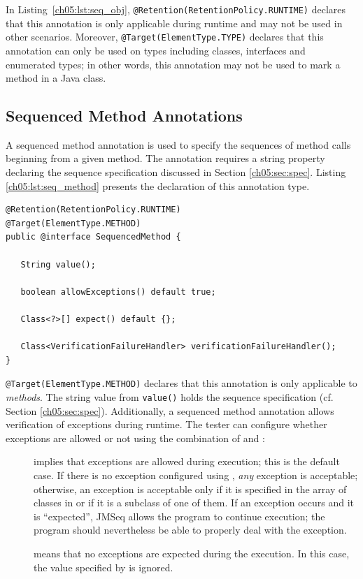 In Listing~\ref{ch05:lst:seq_obj}, {\small\texttt{@Retention(RetentionPolicy.RUNTIME)}} declares that this
annotation is only applicable during runtime and may  not be used in other scenarios.
Moreover, {\small\texttt{@Target(ElementType.TYPE)}} declares that this
annotation can only be used on types including classes, interfaces and
enumerated types; in other words, this annotation may not be used to mark a method
in a Java class.

\subsection{Sequenced Method Annotations}
A sequenced method annotation is used to specify the sequences of method
calls beginning from a given method. The annotation requires a string
property declaring the sequence specification discussed in Section
\ref{ch05:sec:spec}. Listing \ref{ch05:lst:seq_method} presents the declaration of
this annotation type.

\lstset{language=Java}
\begin{lstlisting}[label=ch05:lst:seq_method, caption=SequencedMethod Annotation Declaration]
@Retention(RetentionPolicy.RUNTIME)
@Target(ElementType.METHOD)
public @interface SequencedMethod {

   String value();

   boolean allowExceptions() default true;

   Class<?>[] expect() default {};

   Class<VerificationFailureHandler> verificationFailureHandler();
}
\end{lstlisting}

{\small\texttt{@Target(ElementType.METHOD)}} declares that this annotation is
only applicable to \textit{methods}. The string value from
{\small\texttt{value()}} holds the sequence specification (cf.
Section \ref{ch05:sec:spec}). 
Additionally, a sequenced method annotation allows verification of
exceptions during runtime. The tester can configure whether exceptions
are allowed or not using the combination of 
and :
\begin{description}
  \item[] implies that exceptions are allowed during execution; 
  this is the default case.
If there is no exception configured using ,
\emph{any} exception is acceptable; otherwise,  an exception is acceptable 
only if it is specified in the array
of classes in  or if it is a subclass of one of them.
If an exception occurs and it is ``expected'', JMSeq allows the program to continue execution;
the program should nevertheless be able to properly deal with the exception.

  \item[]  means that no exceptions are
expected during the execution. In this case, the value specified by
 is ignored.
\end{description}

